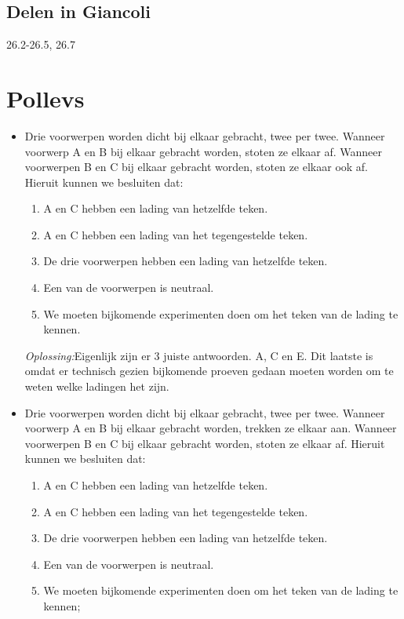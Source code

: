 \documentclass[12pt,a4paper]{article}
\begin{document}
    \subsection{Delen in Giancoli}
    26.2-26.5, 26.7
    
    
    \section{Pollevs}
    \begin{itemize}
    \renewcommand\labelitemi{--}
    \item Drie voorwerpen worden dicht bij elkaar gebracht, twee per twee. Wanneer voorwerp A en B bij elkaar gebracht worden, stoten ze elkaar af. Wanneer voorwerpen B en C bij elkaar gebracht worden, stoten ze elkaar ook af. Hieruit kunnen we besluiten dat:
    \begin{enumerate}[label=\alph*]
    	\item A en C hebben een lading van hetzelfde teken.
    	\item A en C hebben een lading van het tegengestelde teken.
    	\item De drie voorwerpen hebben een lading van hetzelfde teken. 
    	\item Een van de voorwerpen is neutraal. 
    	\item We moeten bijkomende experimenten doen om het teken van de lading te kennen. 
    \end{enumerate}
	\textit{Oplossing:}Eigenlijk zijn er 3 juiste antwoorden. A, C en E. Dit laatste is omdat er technisch gezien bijkomende proeven gedaan moeten worden om te weten welke ladingen het zijn. 
	\newline
	\item Drie voorwerpen worden dicht bij elkaar gebracht, twee per twee. Wanneer voorwerp A en B bij elkaar gebracht worden, trekken ze elkaar aan. Wanneer voorwerpen B en C bij elkaar gebracht worden, stoten ze elkaar af. Hieruit kunnen we besluiten dat: 
	\begin{enumerate}[label=\alph*]
		\item A en C hebben een lading van hetzelfde teken. 
		\item A en C hebben een lading van het tegengestelde teken. 
		\item De drie voorwerpen hebben een lading van hetzelfde teken. 
		\item Een van de voorwerpen is neutraal. 
		\item We moeten bijkomende experimenten doen om het teken van de lading te kennen; 

\end{enumerate}
\end{itemize}
\end{document}
